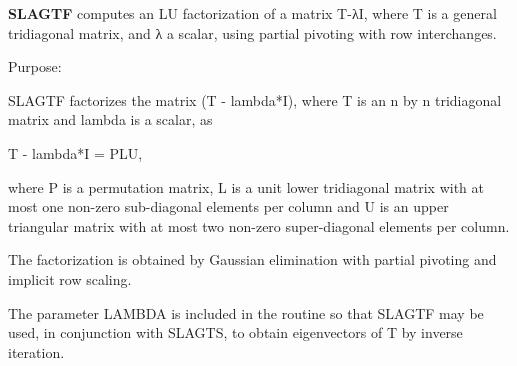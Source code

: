 {\bfseries S\+L\+A\+G\+T\+F} computes an L\+U factorization of a matrix T-\/λ\+I, where T is a general tridiagonal matrix, and λ a scalar, using partial pivoting with row interchanges. 

 \begin{DoxyParagraph}{Purpose\+: }
\begin{DoxyVerb} SLAGTF factorizes the matrix (T - lambda*I), where T is an n by n
 tridiagonal matrix and lambda is a scalar, as

    T - lambda*I = PLU,

 where P is a permutation matrix, L is a unit lower tridiagonal matrix
 with at most one non-zero sub-diagonal elements per column and U is
 an upper triangular matrix with at most two non-zero super-diagonal
 elements per column.

 The factorization is obtained by Gaussian elimination with partial
 pivoting and implicit row scaling.

 The parameter LAMBDA is included in the routine so that SLAGTF may
 be used, in conjunction with SLAGTS, to obtain eigenvectors of T by
 inverse iteration.\end{DoxyVerb}
 
\end{DoxyParagraph}

